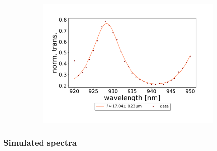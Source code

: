 \begin{figure}[h!] \ContinuedFloat
    \centering
    \begin{subfigure}[b]{0.49\textwidth}
        \includegraphics[width=\textwidth]{figures/results/double fano fits/30um_M3:M5_FSR_scan.pdf}
        \caption{}
        \label{fig:30um_M3:M5_FSR_scan}
    \end{subfigure}
\end{figure}

\clearpage
\subsubsection*{Simulated spectra}

